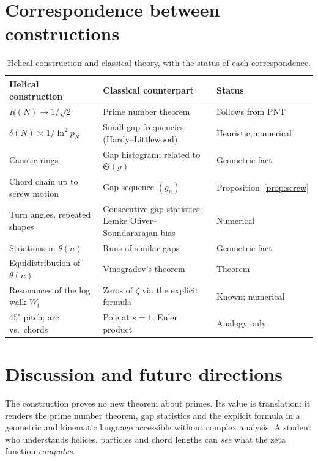 \documentclass[11pt,a4paper]{article}
\theoremstyle{remark}
\theoremstyle{definition}
\newcommand{\dg}{^\circ}
\begin{document}
\section{Correspondence between constructions}

\begin{table}[ht]
\centering
\small
\begin{tabular}{>{\raggedright}p{4.4cm}>{\raggedright}p{5.6cm}p{2.9cm}}
\toprule
Helical construction & Classical counterpart & Status\\
\midrule
$R(N)\to1/\sqrt2$ & Prime number theorem & Follows from PNT\\
$\delta(N)\asymp1/\ln^2p_N$ & Small-gap frequencies (Hardy--Littlewood) & Heuristic, numerical\\
Caustic rings & Gap histogram; related to $\mathfrak S(g)$ & Geometric fact\\
Chord chain up to screw motion & Gap sequence $(g_n)$ & Proposition~\ref{prop:screw}\\
Turn angles, repeated shapes & Consecutive-gap statistics; Lemke Oliver--Soundararajan bias & Numerical\\
Striations in $\theta(n)$ & Runs of similar gaps & Geometric fact\\
Equidistribution of $\theta(n)$ & Vinogradov's theorem & Theorem\\
Resonances of the log walk $W_t$ & Zeros of $\zeta$ via the explicit formula & Known; numerical\\
$45\dg$ pitch; arc vs.\ chords & Pole at $s=1$; Euler product & Analogy only\\
\bottomrule
\end{tabular}
\caption{Helical construction and classical theory, with the status of each correspondence.}
\end{table}

\section{Discussion and future directions}
The construction proves no new theorem about primes. Its value is translation: it renders the prime number theorem, gap statistics and the explicit formula in a geometric and kinematic language accessible without complex analysis. A student who understands helices, particles and chord lengths can \emph{see} what the zeta function \emph{computes}.
\end{document}
